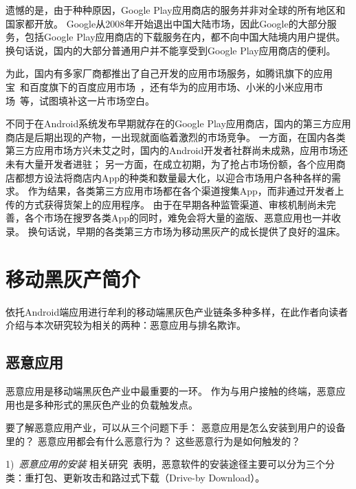 遗憾的是，由于种种原因，Google Play应用商店的服务并非对全球的所有地区和国家都开放。
Google从2008年开始退出中国大陆市场，因此Google的大部分服务，包括Google Play应用商店的下载服务在内，都不向中国大陆境内用户提供。
换句话说，国内的大部分普通用户并不能享受到Google Play应用商店的便利。

为此，国内有多家厂商都推出了自己开发的应用市场服务，如腾讯旗下的应用宝~\cite{Myapp}和百度旗下的百度应用市场~\cite{Baiduappstore}，还有华为的应用市场、小米的小米应用市场~\cite{Xiaomiappstore}等，试图填补这一片市场空白。
%

不同于在Android系统发布早期就存在的Google Play应用商店，国内的第三方应用商店是后期出现的产物，一出现就面临着激烈的市场竞争。
一方面，在国内各类第三方应用市场方兴未艾之时，国内的Android开发者社群尚未成熟，应用市场还未有大量开发者进驻；
另一方面，在成立初期，为了抢占市场份额，各个应用商店都想方设法将商店内App的种类和数量最大化，以迎合市场用户各种各样的需求。
作为结果，各类第三方应用市场都在各个渠道搜集App，而非通过开发者上传的方式获得货架上的应用程序。
由于在早期各种监管渠道、审核机制尚未完善，各个市场在搜罗各类App的同时，难免会将大量的盗版、恶意应用也一并收录。
换句话说，早期的各类第三方市场为移动黑灰产的成长提供了良好的温床。

\section{移动黑灰产简介}
依托Android端应用进行牟利的移动端黑灰色产业链条多种多样，在此作者向读者介绍与本次研究较为相关的两种：恶意应用与排名欺诈。

\subsection{恶意应用}
恶意应用是移动端黑灰色产业中最重要的一环。
作为与用户接触的终端，恶意应用也是多种形式的黑灰色产业的负载触发点。

要了解恶意应用产业，可以从三个问题下手：
恶意应用是怎么安装到用户的设备里的？
恶意应用都会有什么恶意行为？
这些恶意行为是如何触发的？

1)\ \emph{恶意应用的安装} \quad
相关研究~\cite{Zhou2012DissectingAM}表明，恶意软件的安装途径主要可以分为三个分类：重打包、更新攻击和路过式下载（Drive-by Download）。

